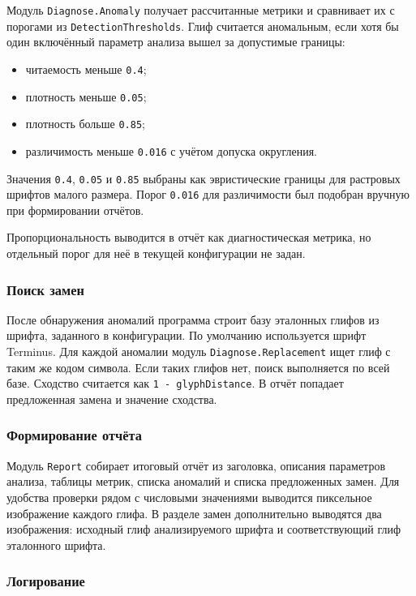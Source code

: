 Модуль \texttt{Diagnose.Anomaly} получает рассчитанные метрики и сравнивает их с порогами из \texttt{DetectionThresholds}. Глиф считается аномальным, если хотя бы один включённый параметр анализа вышел за допустимые границы:

\begin{itemize}
    \item читаемость меньше \texttt{0.4};
    \item плотность меньше \texttt{0.05};
    \item плотность больше \texttt{0.85};
    \item различимость меньше \texttt{0.016} с учётом допуска округления.
\end{itemize}

Значения \texttt{0.4}, \texttt{0.05} и \texttt{0.85} выбраны как эвристические границы для растровых шрифтов малого размера. Порог \texttt{0.016} для различимости был подобран вручную при формировании отчётов.

Пропорциональность выводится в отчёт как диагностическая метрика, но отдельный порог для неё в текущей конфигурации не задан.

\subsubsection{Поиск замен}

После обнаружения аномалий программа строит базу эталонных глифов из шрифта, заданного в конфигурации. По умолчанию используется шрифт Terminus. Для каждой аномалии модуль \texttt{Diagnose.Replacement} ищет глиф с таким же кодом символа. Если таких глифов нет, поиск выполняется по всей базе. Сходство считается как \texttt{1 - glyphDistance}. В отчёт попадает предложенная замена и значение сходства.

\subsubsection{Формирование отчёта}

Модуль \texttt{Report} собирает итоговый отчёт из заголовка, описания параметров анализа, таблицы метрик, списка аномалий и списка предложенных замен. Для удобства проверки рядом с числовыми значениями выводится пиксельное изображение каждого глифа. В разделе замен дополнительно выводятся два изображения: исходный глиф анализируемого шрифта и соответствующий глиф эталонного шрифта.

\subsubsection{Логирование}

